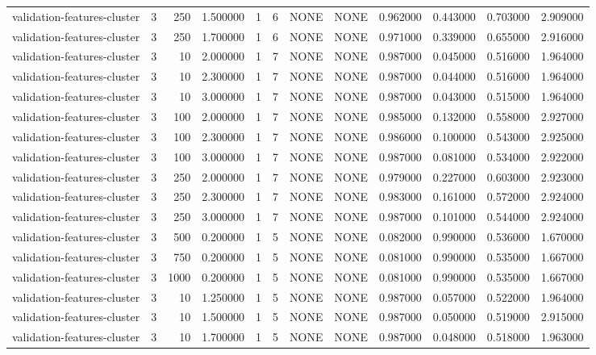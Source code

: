 \begin{tabular}{lrrrllllrrrr}
validation-features-cluster & 3 & 250 & 1.500000 & 1 & 6 & NONE & NONE & 0.962000 & 0.443000 & 0.703000 & 2.909000 \\
validation-features-cluster & 3 & 250 & 1.700000 & 1 & 6 & NONE & NONE & 0.971000 & 0.339000 & 0.655000 & 2.916000 \\
validation-features-cluster & 3 & 10 & 2.000000 & 1 & 7 & NONE & NONE & 0.987000 & 0.045000 & 0.516000 & 1.964000 \\
validation-features-cluster & 3 & 10 & 2.300000 & 1 & 7 & NONE & NONE & 0.987000 & 0.044000 & 0.516000 & 1.964000 \\
validation-features-cluster & 3 & 10 & 3.000000 & 1 & 7 & NONE & NONE & 0.987000 & 0.043000 & 0.515000 & 1.964000 \\
validation-features-cluster & 3 & 100 & 2.000000 & 1 & 7 & NONE & NONE & 0.985000 & 0.132000 & 0.558000 & 2.927000 \\
validation-features-cluster & 3 & 100 & 2.300000 & 1 & 7 & NONE & NONE & 0.986000 & 0.100000 & 0.543000 & 2.925000 \\
validation-features-cluster & 3 & 100 & 3.000000 & 1 & 7 & NONE & NONE & 0.987000 & 0.081000 & 0.534000 & 2.922000 \\
validation-features-cluster & 3 & 250 & 2.000000 & 1 & 7 & NONE & NONE & 0.979000 & 0.227000 & 0.603000 & 2.923000 \\
validation-features-cluster & 3 & 250 & 2.300000 & 1 & 7 & NONE & NONE & 0.983000 & 0.161000 & 0.572000 & 2.924000 \\
validation-features-cluster & 3 & 250 & 3.000000 & 1 & 7 & NONE & NONE & 0.987000 & 0.101000 & 0.544000 & 2.924000 \\
validation-features-cluster & 3 & 500 & 0.200000 & 1 & 5 & NONE & NONE & 0.082000 & 0.990000 & 0.536000 & 1.670000 \\
validation-features-cluster & 3 & 750 & 0.200000 & 1 & 5 & NONE & NONE & 0.081000 & 0.990000 & 0.535000 & 1.667000 \\
validation-features-cluster & 3 & 1000 & 0.200000 & 1 & 5 & NONE & NONE & 0.081000 & 0.990000 & 0.535000 & 1.667000 \\
validation-features-cluster & 3 & 10 & 1.250000 & 1 & 5 & NONE & NONE & 0.987000 & 0.057000 & 0.522000 & 1.964000 \\
validation-features-cluster & 3 & 10 & 1.500000 & 1 & 5 & NONE & NONE & 0.987000 & 0.050000 & 0.519000 & 2.915000 \\
validation-features-cluster & 3 & 10 & 1.700000 & 1 & 5 & NONE & NONE & 0.987000 & 0.048000 & 0.518000 & 1.963000 \\

\end{tabular}
